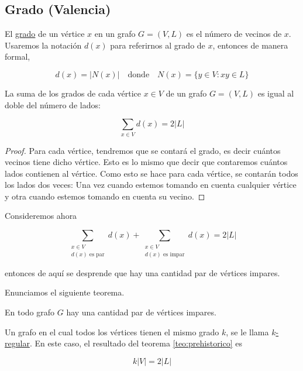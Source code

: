 \subsection{Grado (Valencia)}

\begin{defn}
    El \ul{grado} de un vértice $x$ en un grafo $G=(V,L)$ es el número de vecinos de $x$. Usaremos la notación $d(x)$ para referirnos al grado de $x$, entonces de manera formal,
    
    \[
    d(x) = |N(x)| \quad \text{donde} \quad N(x) = \{ y \in V : xy \in L \}
    \]
\end{defn}

\begin{teo}\label{teo:prehistorico}
    La suma de los grados de cada vértice $x \in V$ de un grafo $G = (V,L)$ es igual al doble del número de lados:
    
    \[
    \sum_{x \in V} d(x) = 2|L|
    \]
\end{teo}

\begin{proof}
    Para cada vértice, tendremos que se contará el grado, es decir cuántos vecinos tiene dicho vértice. Esto es lo mismo que decir que contaremos cuántos lados contienen al vértice. Como esto se hace para cada vértice, se contarán todos los lados dos veces: Una vez cuando estemos tomando en cuenta cualquier vértice y otra cuando estemos tomando en cuenta su vecino.
\end{proof}

Consideremos ahora

\[
\sum_{\substack{x \in V \\ d(x) \text{ es par}}} d(x) + \sum_{\substack{x \in V \\ d(x) \text{ es impar}}} d(x) = 2|L|
\]

entonces de aquí se desprende que hay una cantidad par de vértices impares.

Enunciamos el siguiente teorema.

\begin{teo}
    En todo grafo $G$ hay una cantidad par de vértices impares.
\end{teo}

\begin{defn}
    Un grafo en el cual todos los vértices tienen el mismo grado $k$, se le llama \ul{$k$-regular}. En este caso, el resultado del teorema \ref{teo:prehistorico} es
    
    \[
    k|V| = 2|L|
    \]
\end{defn}

